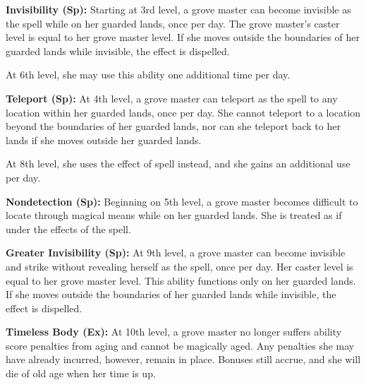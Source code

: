 {\textbf{Invisibility (Sp):} Starting at 3rd level, a grove master can become invisible as the  spell while on her guarded lands, once per day. The grove master's caster level is equal to her grove master level. If she moves outside the boundaries of her guarded lands while invisible, the effect is dispelled.

At 6th level, she may use this ability one additional time per day.

\textbf{Teleport (Sp):} At 4th level, a grove master can teleport as the  spell to any location within her guarded lands, once per day. She cannot teleport to a location beyond the boundaries of her guarded lands, nor can she teleport back to her lands if she moves outside her guarded lands.

At 8th level, she uses the effect of  spell instead, and she gains an additional use per day.

\textbf{Nondetection (Sp):} Beginning on 5th level, a grove master becomes difficult to locate through magical means while on her guarded lands. She is treated as if under the effects of the  spell.

\textbf{Greater Invisibility (Sp):} At 9th level, a grove master can become invisible and strike without revealing herself as the  spell, once per day. Her caster level is equal to her grove master level. This ability functions only on her guarded lands. If she moves outside the boundaries of her guarded lands while invisible, the effect is dispelled.

\textbf{Timeless Body (Ex):} At 10th level, a grove master no longer suffers ability score penalties from aging and cannot be magically aged. Any penalties she may have already incurred, however, remain in place. Bonuses still accrue, and she will die of old age when her time is up.
}

